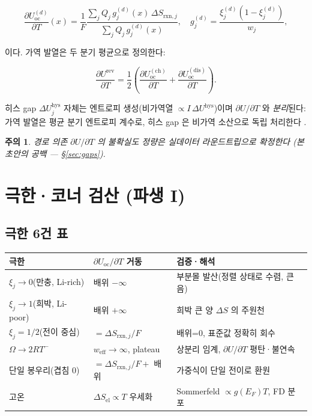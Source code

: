 \documentclass[11pt,a4paper]{article}
\newtheorem*{warnbox}{주의}
\newcommand{\rxn}{\mathrm{rxn}}
\newcommand{\rev}{\mathrm{rev}}
\newcommand{\oc}{\mathrm{oc}}
\newcommand{\elec}{\mathrm{el}}
\newcommand{\eff}{\mathrm{eff}}
\newcommand{\hys}{\mathrm{hys}}
\begin{document}
\begin{equation}
  \frac{\partial U_\oc^{(d)}}{\partial T}(x)
  = \frac{1}{F}\frac{\sum_j Q_j\,g_j^{(d)}(x)\,\Delta S_{\rxn,j}}{\sum_j Q_j\,g_j^{(d)}(x)},
  \quad g_j^{(d)} = \frac{\xi_j^{(d)}(1-\xi_j^{(d)})}{w_j},
  \label{eq:hys_branch}
\end{equation}

이다. 가역 발열은 두 분기 평균으로 정의한다:

\begin{equation}
  \frac{\partial U^\rev}{\partial T}
  = \frac{1}{2}\left(\frac{\partial U_\oc^{(\mathrm{ch})}}{\partial T}
    + \frac{\partial U_\oc^{(\mathrm{dis})}}{\partial T}\right).
  \label{eq:rev_avg}
\end{equation}

히스 gap $\Delta U_j^\hys$ 자체는 엔트로피 생성(비가역열 $\propto I\,\Delta U^\hys$)이며
$\partial U/\partial T$ 와 \emph{분리}된다: 가역 발열은 평균 분기 엔트로피 계수로, 히스 gap 은
비가역 소산으로 독립 처리한다 \cite{hysteresis2018}.

\begin{warnbox}
경로 의존 $\partial U/\partial T$ 의 불확실도 정량은 실데이터 라운드트립으로 확정한다
(본 초안의 공백 — §\ref{sec:gaps}).
\end{warnbox}

\section{극한·코너 검산 (파생 I)}\label{sec:limits}

\subsection{극한 6건 표}

\begin{center}
\small
\renewcommand{\arraystretch}{1.3}
\begin{tabular}{lll}
\toprule
극한 & $\partial U_\oc/\partial T$ 거동 & 검증·해석 \\
\midrule
$\xi_j \to 0$(만충, Li-rich) & 배위 $-\infty$ & 부분몰 발산(정렬 상태로 수렴, 큰 음) \\
$\xi_j \to 1$(희박, Li-poor) & 배위 $+\infty$ & 희박 큰 양 $\Delta S$ 의 주원천 \\
$\xi_j = 1/2$(전이 중심) & $= \Delta S_{\rxn,j}/F$ & 배위=0, 표준값 정확히 회수 \\
$\Omega \to 2RT^-$ & $w_\eff \to \infty$, plateau & 상분리 임계, $\partial U/\partial T$ 평탄·불연속 \\
단일 봉우리(겹침 0) & $= \Delta S_{\rxn,j}/F + $ 배위 & 가중식이 단일 전이로 환원 \\
고온 & $\Delta S_\elec \propto T$ 우세화 & Sommerfeld $\propto g(E_F)T$, FD 분포 \\
\bottomrule
\end{tabular}
\end{center}
\end{document}
